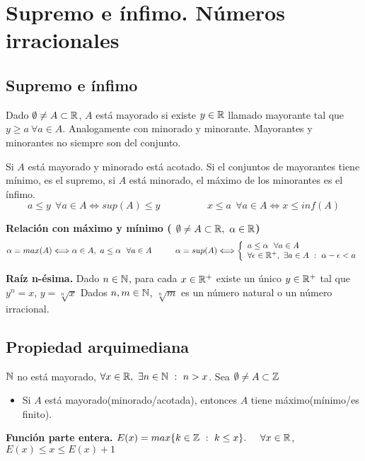 \section{Supremo e ínfimo. Números irracionales}
\subsection{Supremo e ínfimo}
Dado $\emptyset\not = A\subset \mathbb{R}$, $A$ está mayorado si existe $y\in\mathbb{R}$ llamado mayorante tal que $y\geq a \ \forall a\in A$. Analogamente con minorado y minorante.
 Mayorantes y minorantes no siempre son del conjunto.

Si $A$ está mayorado y minorado está acotado.
Si el conjuntos de mayorantes tiene mínimo, es el supremo, si $A$ está minorado, el máximo de los minorantes es el ínfimo.
$$ a\leq y \ \ \forall a\in A \Longleftrightarrow sup(A)\leq y
\hspace{2cm}
x\leq a \ \ \forall a\in A \Longleftrightarrow x \leq inf(A)$$

\textbf{Relación con máximo y mínimo (
$\emptyset \not = A \subset \R , \ \alpha\in\R$)}
$$ \alpha = max (A) \Longleftrightarrow \alpha\in A, \ a\leq\alpha \ \ \forall a\in A 
\hspace{1cm}
\alpha = sup (A) \Longleftrightarrow 
  \left\lbrace
  \begin{array}{l}
	  a\leq\alpha \ \  \forall a\in A \\
	  \forall\epsilon\in\mathbb{R} ^+ , \ \exists a\in A \ : \ \alpha - \epsilon < a\\
  \end{array}
  \right.
$$

\textbf{Raíz n-ésima.}
Dado $n\in\mathbb{N}$, para cada $x\in\mathbb{R} ^+$ existe un único $y\in\mathbb{R} ^+$ tal que $y^n=x$, $y=\sqrt[n]{x}$
Dados $n,m\in\mathbb{N}$, $\sqrt[n]{m}$ es un número natural o un número irracional.

\subsection{Propiedad arquimediana}
$\mathbb{N}$ no está mayorado, $\forall x\in\R ,\ \exists n\in\N \ : \ n>x$.
Sea $\emptyset\not =A\subset\mathbb{Z}$
\begin{itemize}
	\item Si $A$ está mayorado(minorado/acotada), entonces $A$ tiene máximo(mínimo/es finito).
\end{itemize}
\textbf{Función parte entera.} 
$E(x) = max\{k\in\mathbb{Z} \ : \ k\leq x\}. \hspace{0.5cm} \forall x\in\mathbb{R}$, $E(x)\leq x\leq E(x)+1$

